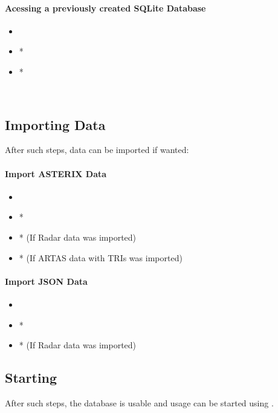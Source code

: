 \paragraph{Acessing a previously created SQLite Database} 

\begin{itemize}
 \item {}
 \item {}*
 \item {}*
\end{itemize}
\ \\

\subsection{Importing Data}

After such steps, data can be imported if wanted:

\paragraph{Import ASTERIX Data} 

\begin{itemize}
 \item {}
 \item {}*
 \item {}* (If Radar data was imported)
 \item {}* (If ARTAS data with TRIs was imported)
\end{itemize}

\paragraph{Import JSON Data} 

\begin{itemize}
 \item {}
 \item {}*
 \item {}* (If Radar data was imported)
\end{itemize}

\subsection{Starting}
After such steps, the database is usable and usage can be started using .
